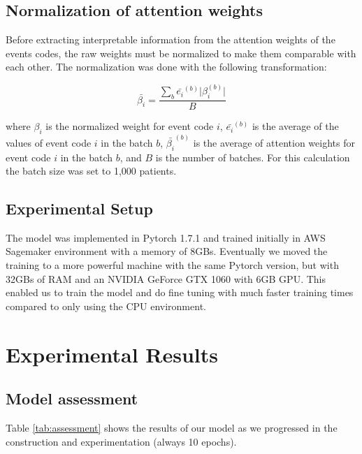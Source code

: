 \documentclass{sigkddExp}
\begin{document}
\subsection{Normalization of attention weights}
Before extracting interpretable information from the attention weights of the events codes, the raw weights 
must be normalized to make them comparable with each other.  The normalization was done with the following 
transformation:

\begin{equation}
       \bar{\beta_i} = \frac{\sum_{b}\bar{e_i}^{(b)} \lvert\beta_i^{(b)}\rvert }{B}
\end{equation}

where $\beta_i$ is the normalized weight for event code $i$, $\bar{e_i}^{(b)}$ is the average of the values of event 
code $i$ in the batch $b$, $\bar{\beta_i}^{(b)}$ is the average of attention weights for event code $i$ 
in the batch $b$, and $B$ is the number of batches.  For this calculation the batch size was set to 1,000 patients.

\subsection{Experimental Setup}
The model was implemented in Pytorch 1.7.1 and trained initially in AWS Sagemaker environment 
with a memory of 8GBs. Eventually we moved the training to a more powerful machine with the same 
Pytorch version, but with 32GBs of RAM and an NVIDIA GeForce GTX 1060 with 6GB GPU. This enabled 
us to train the model and do fine tuning with much faster training times compared to only using 
the CPU environment.

\section{Experimental Results}
\subsection{Model assessment}
Table \ref{tab:assessment} shows the results of our model as we progressed in the construction and experimentation (always 10 epochs).
\end{document}
